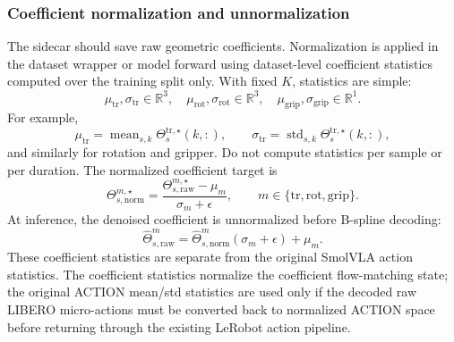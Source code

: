 \documentclass[10pt,twocolumn,letterpaper]{article}
\begin{document}
\subsubsection*{Coefficient normalization and unnormalization}
The sidecar should save raw geometric coefficients. Normalization is applied in the dataset wrapper or model forward using dataset-level coefficient statistics computed over the training split only. With fixed $K$, statistics are simple:
\begin{equation}
\mu_{\mathrm{tr}},\sigma_{\mathrm{tr}}\in\mathbb{R}^{3},
\quad
\mu_{\mathrm{rot}},\sigma_{\mathrm{rot}}\in\mathbb{R}^{3},
\quad
\mu_{\mathrm{grip}},\sigma_{\mathrm{grip}}\in\mathbb{R}^{1}.
\end{equation}
For example,
\begin{equation}
\mu_{\mathrm{tr}}=\operatorname{mean}_{s,k}\Theta_s^{\mathrm{tr},\star}(k,:),
\qquad
\sigma_{\mathrm{tr}}=\operatorname{std}_{s,k}\Theta_s^{\mathrm{tr},\star}(k,:),
\end{equation}
and similarly for rotation and gripper. Do not compute statistics per sample or per duration. The normalized coefficient target is
\begin{equation}
\Theta_{s,\mathrm{norm}}^{m,\star}=
\frac{\Theta_{s,\mathrm{raw}}^{m,\star}-\mu_m}{\sigma_m+\epsilon},
\qquad m\in\{\mathrm{tr},\mathrm{rot},\mathrm{grip}\}.
\end{equation}
At inference, the denoised coefficient is unnormalized before B-spline decoding:
\begin{equation}
\hat\Theta_{s,\mathrm{raw}}^m=
\hat\Theta_{s,\mathrm{norm}}^m(\sigma_m+\epsilon)+\mu_m.
\end{equation}
These coefficient statistics are separate from the original SmolVLA action statistics. The coefficient statistics normalize the coefficient flow-matching state; the original ACTION mean/std statistics are used only if the decoded raw LIBERO micro-actions must be converted back to normalized ACTION space before returning through the existing LeRobot action pipeline.
\end{document}
